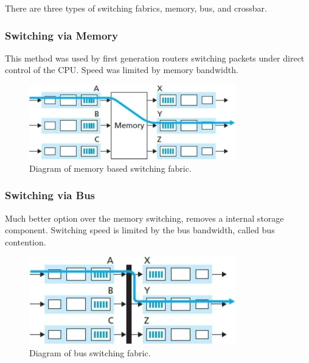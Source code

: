 \documentclass[12pt]{article}
\begin{document}
	There are three types of switching fabrics, memory, bus, and crossbar.
	\subsubsection{Switching via Memory}
	This method was used by first generation routers switching packets under direct control of the CPU. Speed was limited by memory bandwidth.
	\begin{figure}[ht!]
		\centering
		\includegraphics[width=0.8\textwidth]{mem_swt}
		\caption{Diagram of memory based switching fabric.}
		\label{fig:mem_swt}
	\end{figure}
	\subsubsection{Switching via Bus}
	Much better option over the memory switching, removes a internal storage component. Switching speed is limited by the bus bandwidth, called bus contention.
	\begin{figure}[ht!]
		\centering
		\includegraphics[width=0.8\textwidth]{bus_swt}
		\caption{Diagram of bus switching fabric.}
		\label{fig:bus_swt}
	\end{figure}
\end{document}
